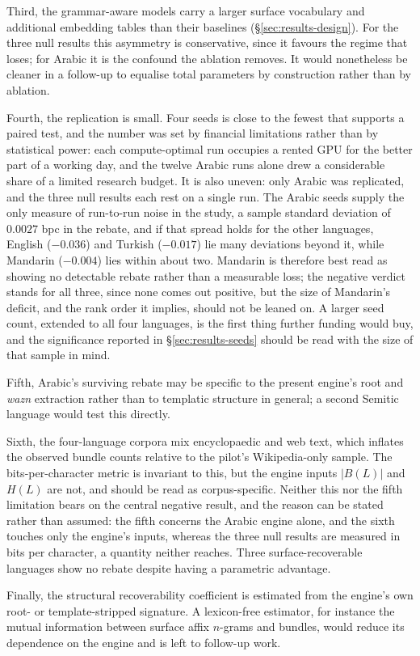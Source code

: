 Third, the grammar-aware models carry a larger surface vocabulary and additional embedding tables than their baselines (\S\ref{sec:results-design}). For the three null results this asymmetry is conservative, since it favours the regime that loses; for Arabic it is the confound the ablation removes. It would nonetheless be cleaner in a follow-up to equalise total parameters by construction rather than by ablation.

Fourth, the replication is small. Four seeds is close to the fewest that supports a paired test, and the number was set by financial limitations rather than by statistical power: each compute-optimal run occupies a rented GPU for the better part of a working day, and the twelve Arabic runs alone drew a considerable share of a limited research budget. It is also uneven: only Arabic was replicated, and the three null results each rest on a single run. The Arabic seeds supply the only measure of run-to-run noise in the study, a sample standard deviation of $0.0027$ bpc in the rebate, and if that spread holds for the other languages, English ($-0.036$) and Turkish ($-0.017$) lie many deviations beyond it, while Mandarin ($-0.004$) lies within about two. Mandarin is therefore best read as showing no detectable rebate rather than a measurable loss; the negative verdict stands for all three, since none comes out positive, but the size of Mandarin's deficit, and the rank order it implies, should not be leaned on. A larger seed count, extended to all four languages, is the first thing further funding would buy, and the significance reported in \S\ref{sec:results-seeds} should be read with the size of that sample in mind.

Fifth, Arabic's surviving rebate may be specific to the present engine's root and \emph{wazn} extraction rather than to templatic structure in general; a second Semitic language would test this directly.

Sixth, the four-language corpora mix encyclopaedic and web text, which inflates the observed bundle counts relative to the pilot's Wikipedia-only sample. The bits-per-character metric is invariant to this, but the engine inputs $|B(L)|$ and $H(L)$ are not, and should be read as corpus-specific. Neither this nor the fifth limitation bears on the central negative result, and the reason can be stated rather than assumed: the fifth concerns the Arabic engine alone, and the sixth touches only the engine's inputs, whereas the three null results are measured in bits per character, a quantity neither reaches. Three surface-recoverable languages show no rebate despite having a parametric advantage.

Finally, the structural recoverability coefficient is estimated from the engine's own root- or template-stripped signature. A lexicon-free estimator, for instance the mutual information between surface affix $n$-grams and bundles, would reduce its dependence on the engine and is left to follow-up work.
